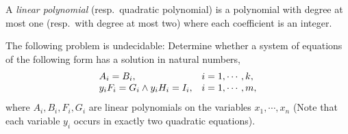 %
 
A \emph{linear polynomial} (resp.\ quadratic polynomial) is a polynomial with degree at most one (resp.\ with degree at most two) where each coefficient is an integer. %

\begin{theorem}[\cite{ID04}]\label{thm-quad-eq}
	The following problem is undecidable: Determine whether a system of equations of the following form has a solution in natural numbers, 
	\[
	\begin{array} {l l }
	A_i = B_i, & i =1, \cdots, k,\\
	y_iF_i=G_i \wedge y_i H_i = I_i, & i =1, \cdots, m, 
	\end{array}
	\] 
	where $A_i, B_i, F_i, G_i$ are linear polynomials on the variables $x_1,\cdots, x_n$ (Note that each variable $y_i$ occurs in exactly two quadratic equations).
\end{theorem}

